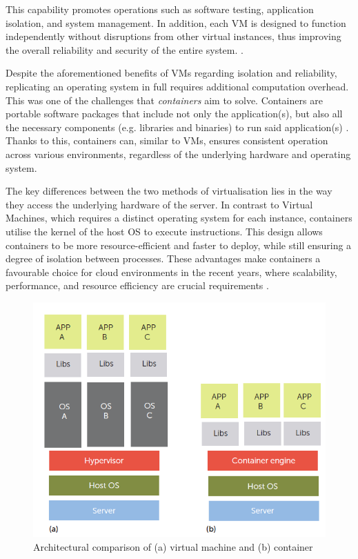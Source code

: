 This capability promotes operations such as software testing, application isolation, and system management. In addition, each VM is designed to function independently without disruptions from other virtual instances, thus improving the overall reliability and security of the entire system. \cite{goldbergSurveyVirtualMachine1974}.

Despite the aforementioned benefits of VMs regarding isolation and reliability, replicating an operating system in full requires additional computation overhead. This was one of the challenges that \textit{containers} aim to solve. Containers are portable software packages that include not only the application(s), but also all the necessary components (e.g. libraries and binaries) to run said application(s) \cite{bernsteinContainersCloudLXC2014}. Thanks to this, containers can, similar to VMs, ensures consistent operation across various environments, regardless of the underlying hardware and operating system.

The key differences between the two methods of virtualisation lies in the way they access the underlying hardware of the server. In contrast to Virtual Machines, which requires a distinct operating system for each instance, containers utilise the kernel of the host OS to execute instructions. This design allows containers to be more resource-efficient and faster to deploy, while still ensuring a degree of isolation between processes. These advantages make containers a favourable choice for cloud environments in the recent years, where scalability, performance, and resource efficiency are crucial requirements \cite{bernsteinContainersCloudLXC2014, felterUpdatedPerformanceComparison2015}.

\begin{figure}
    \centering
    \includegraphics[width=0.7\linewidth]{resources/eea3da004befcc5437960cbc868be634.png}
    \caption{Architectural comparison of (a) virtual machine and (b) container \cite{bernsteinContainersCloudLXC2014}}
    \label{fig:vms-vs-containers}
\end{figure}

